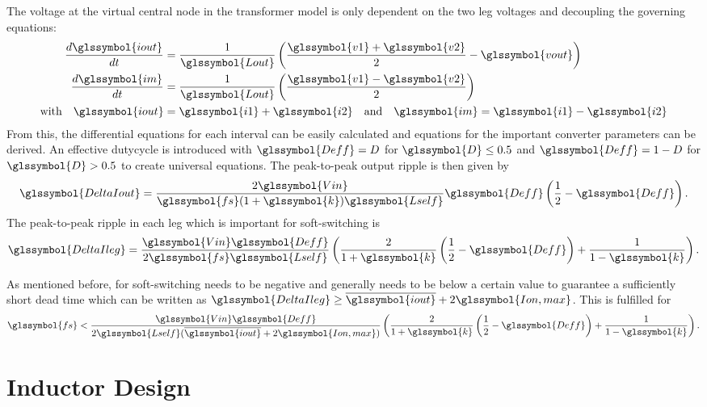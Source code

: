 \documentclass{IPEC2026}
\newcommand{\sbl}[1]{\glssymbol{#1}}
\begin{document}
The voltage at the virtual central node in the transformer model is only dependent on the two leg voltages \sbl{v1} and \sbl{v2} decoupling the governing equations:
\begin{equation}
  \label{eq:TransformerModel}
  \begin{aligned}
    \frac{d\sbl{iout}}{dt} &= \frac{1}{\sbl{Lout}} \left (\frac{\sbl{v1} + \sbl{v2}}{2}-\sbl{vout} \right ) \\
    \frac{d\sbl{im}}{dt} &= \frac{1}{\sbl{Lout}} \left (\frac{\sbl{v1} - \sbl{v2}}{2} \right ) \\
    \text{with} \quad \sbl{iout} &= \sbl{i1} + \sbl{i2} \quad \text{and} \quad \sbl{im} = \sbl{i1} - \sbl{i2}
  \end{aligned}
\end{equation}
From this, the differential equations for each interval can be easily calculated and equations for the important converter parameters can be derived. An effective dutycycle \sbl{Deff} is introduced with $\sbl{Deff} = D$ for $\sbl{D} \leq 0.5$ and $\sbl{Deff} = 1-D$ for $\sbl{D} > 0.5$ to create universal equations. The peak-to-peak output ripple is then given by
\begin{equation}
  \sbl{DeltaIout} = \frac{2\sbl{Vin}}{\sbl{fs}(1+\sbl{k})\sbl{Lself}}\sbl{Deff}\left (\frac{1}{2}-\sbl{Deff} \right ).
  \label{eq:DeltaIout}
\end{equation}
The peak-to-peak ripple in each leg which is important for soft-switching is
\begin{equation}
  \sbl{DeltaIleg} =  \frac{\sbl{Vin}\sbl{Deff}}{2\sbl{fs}\sbl{Lself}} \left (\frac{2}{1+\sbl{k}} \left (\frac{1}{2}-\sbl{Deff} \right ) + \frac{1}{1-\sbl{k}} \right ).
  \label{eq:DeltaIleg}
\end{equation}

As mentioned before, for soft-switching \sbl{Ion} needs to be negative and generally needs to be below a certain value to guarantee a sufficiently short dead time which can be written as $\sbl{DeltaIleg} \geq \overline{\sbl{iout}}+2\sbl{Ion,max}$. This is fulfilled for
\begin{equation}
    \sbl{fs} < \frac{\sbl{Vin}\sbl{Deff}}{2\sbl{Lself}(\overline{\sbl{iout}}+2\sbl{Ion,max})} \left (\frac{2}{1+\sbl{k}}\left (\frac{1}{2}-\sbl{Deff} \right ) + \frac{1}{1-\sbl{k}} \right ).
    \label{eq:ConditionZVS}
\end{equation}

\section{Inductor Design}
\end{document}
